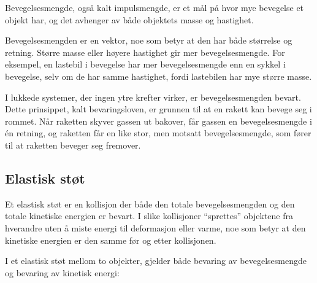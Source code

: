 Bevegelsesmengde, også kalt impulsmengde, er et mål på hvor mye bevegelse et objekt har, og det avhenger av både objektets masse og hastighet.


Bevegelsesmengden er en vektor, noe som betyr at den har både størrelse og retning. Større masse eller høyere hastighet gir mer bevegelsesmengde. For eksempel, en lastebil i bevegelse har mer bevegelsesmengde enn en sykkel i bevegelse, selv om de har samme hastighet, fordi lastebilen har mye større masse.

I lukkede systemer, der ingen ytre krefter virker, er bevegelsesmengden bevart. Dette prinsippet, kalt bevaringsloven, er grunnen til at en rakett kan bevege seg i rommet. Når raketten skyver gassen ut bakover, får gassen en bevegelsesmengde i én retning, og raketten får en like stor, men motsatt bevegelsesmengde, som fører til at raketten beveger seg fremover.


\subsection{Elastisk støt}

Et elastisk støt er en kollisjon der både den totale bevegelsesmengden og den totale kinetiske energien er bevart. I slike kollisjoner ``sprettes''
 objektene fra hverandre uten å miste energi til deformasjon eller varme, noe som betyr at den kinetiske energien er den samme før og etter kollisjonen.

I et elastisk støt mellom to objekter, gjelder både bevaring av bevegelsesmengde og bevaring av kinetisk energi:


